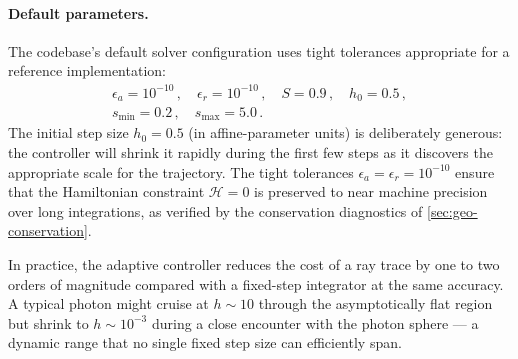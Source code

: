
\paragraph{Default parameters.}

The codebase's default solver configuration uses tight tolerances
appropriate for a reference implementation:
%
\begin{equation}
  \begin{gathered}
  \epsilon_a = 10^{-10} \,, \quad
  \epsilon_r = 10^{-10} \,, \quad
  S = 0.9 \,, \quad
  h_0 = 0.5 \,, \\[4pt]
  s_{\min} = 0.2 \,, \quad
  s_{\max} = 5.0 \,.
  \end{gathered}
  \label{eq:rk-defaults}
\end{equation}
%
The initial step size $h_0 = 0.5$ (in affine-parameter units) is
deliberately generous: the controller will shrink it rapidly during the
first few steps as it discovers the appropriate scale for the
trajectory.  The tight tolerances $\epsilon_a = \epsilon_r = 10^{-10}$
ensure that the Hamiltonian constraint $\mathcal{H} = 0$ is preserved
to near machine precision over long integrations, as verified by the
conservation diagnostics of \cref{sec:geo-conservation}.

In practice, the adaptive controller reduces the cost of a ray trace
by one to two orders of magnitude compared with a fixed-step integrator
at the same accuracy.  A typical photon might cruise at $h \sim 10$
through the asymptotically flat region but shrink to $h \sim 10^{-3}$
during a close encounter with the photon sphere --- a dynamic range
that no single fixed step size can efficiently span.
